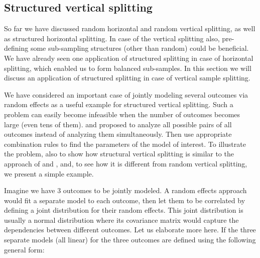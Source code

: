 \documentclass[11pt,a5paper,twoside]{book}
\begin{document}
\subsection{Structured vertical splitting} 

So far we have discussed random horizontal and random vertical splitting, as well as structured horizontal splitting. In case of the vertical splitting also, pre-defining some sub-sampling structures (other than random) could be beneficial. We have already seen one application of structured splitting in case of horizontal splitting, which enabled us to form balanced sub-samples. In this section we will discuss an application of structured splitting in case of vertical sample splitting.

We have considered an important case of jointly modeling several outcomes via random effects as a useful example for structured vertical splitting. Such a problem can easily become infeasible when the number of outcomes becomes large (even tens of them). \cite{fieuws2006} and \cite{fieuws2007} proposed to analyze all possible pairs of all outcomes instead of analyzing them simultaneously. Then use appropriate combination rules to find the parameters of the model of interest. To illustrate the problem, also to show how structural vertical splitting is similar to the approach of \cite{fieuws2006} and \cite{fieuws2007}, and, to see how it is different from random vertical splitting, we present a simple example. 

Imagine we have 3 outcomes to be jointly modeled. A random effects approach would fit a separate model to each outcome, then let them to be correlated by defining a joint distribution for their random effects. This joint distribution is usually a normal distribution where its covariance matrix would capture the dependencies between different outcomes. Let us elaborate more here. If the three separate models (all linear) for the three outcomes are defined using the following general form:
\end{document}
